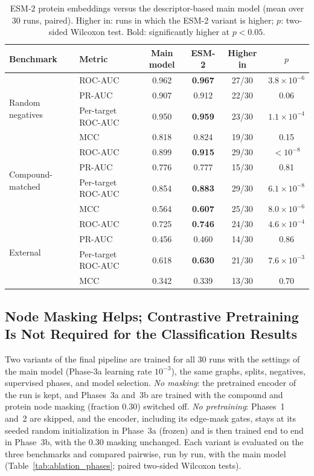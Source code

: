 \documentclass[11pt,letterpaper]{article}
\begin{document}
\begin{table}[!t]
\centering
\caption{ESM-2 protein embeddings versus the descriptor-based main model (mean over 30 runs, paired). Higher in: runs in which the ESM-2 variant is higher; $p$: two-sided Wilcoxon test. Bold: significantly higher at $p<0.05$.}
\label{tab:esm}
\small
\begin{tabular}{llcccc}
\toprule
\textbf{Benchmark} & \textbf{Metric} & \textbf{Main model} & \textbf{ESM-2} & \textbf{Higher in} & $p$ \\
\midrule
\multirow{4}{*}{Random negatives} & ROC-AUC & 0.962 & \textbf{0.967} & 27/30 & $3.8\times10^{-6}$ \\
 & PR-AUC & 0.907 & 0.912 & 22/30 & 0.06 \\
 & Per-target ROC-AUC & 0.950 & \textbf{0.959} & 23/30 & $1.1\times10^{-4}$ \\
 & MCC & 0.818 & 0.824 & 19/30 & 0.15 \\
\midrule
\multirow{4}{*}{Compound-matched} & ROC-AUC & 0.899 & \textbf{0.915} & 29/30 & $<10^{-8}$ \\
 & PR-AUC & 0.776 & 0.777 & 15/30 & 0.81 \\
 & Per-target ROC-AUC & 0.854 & \textbf{0.883} & 29/30 & $6.1\times10^{-8}$ \\
 & MCC & 0.564 & \textbf{0.607} & 25/30 & $8.0\times10^{-6}$ \\
\midrule
\multirow{4}{*}{External} & ROC-AUC & 0.725 & \textbf{0.746} & 24/30 & $4.6\times10^{-4}$ \\
 & PR-AUC & 0.456 & 0.460 & 14/30 & 0.86 \\
 & Per-target ROC-AUC & 0.618 & \textbf{0.630} & 21/30 & $7.6\times10^{-3}$ \\
 & MCC & 0.342 & 0.339 & 13/30 & 0.70 \\
\bottomrule
\end{tabular}
\end{table}

\subsection{Node Masking Helps; Contrastive Pretraining Is Not Required for the Classification Results}
\label{sec:ablation_phases}
Two variants of the final pipeline are trained for all 30 runs with the settings of the main model (Phase-3a learning rate $10^{-3}$), the same graphs, splits, negatives, supervised phases, and model selection. \emph{No masking}: the pretrained encoder of the run is kept, and Phases~3a and~3b are trained with the compound and protein node masking (fraction $0.30$) switched off. \emph{No pretraining}: Phases~1 and~2 are skipped, and the encoder, including its edge-mask gates, stays at its seeded random initialization in Phase~3a (frozen) and is then trained end to end in Phase~3b, with the $0.30$ masking unchanged. Each variant is evaluated on the three benchmarks and compared pairwise, run by run, with the main model (Table~\ref{tab:ablation_phases}; paired two-sided Wilcoxon tests).
\end{document}
